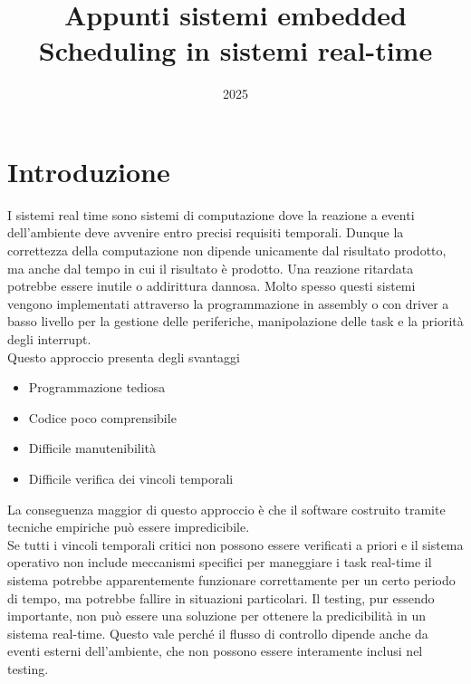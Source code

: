 \documentclass[12pt,openany,onesided]{book}
\title{Appunti sistemi embedded \\ Scheduling in sistemi real-time}
\author{}
\date{2025}
\begin{document}
\maketitle
\tableofcontents
\newpage
\chapter{Introduzione}

I sistemi real time sono sistemi di computazione dove la reazione a eventi dell'ambiente deve avvenire entro precisi requisiti temporali.
Dunque la correttezza della computazione non dipende unicamente dal risultato prodotto, ma anche dal tempo in cui il risultato è prodotto.
Una reazione ritardata potrebbe essere inutile o addirittura dannosa.
Molto spesso questi sistemi vengono implementati attraverso la programmazione in assembly o con driver a basso livello per la gestione delle periferiche, manipolazione delle task 
e la priorità degli interrupt.
\\
Questo approccio presenta degli svantaggi
\begin{itemize}
    \item Programmazione tediosa
    \item Codice poco comprensibile
    \item Difficile manutenibilità
    \item Difficile verifica dei vincoli temporali
\end{itemize}
La conseguenza maggior di questo approccio è che il software costruito tramite tecniche empiriche può  essere impredicibile.\\
Se tutti i vincoli temporali critici non possono essere verificati a priori e il sistema operativo non include meccanismi specifici per maneggiare i task real-time
il sistema potrebbe apparentemente funzionare correttamente per un certo periodo di tempo, ma potrebbe fallire in situazioni particolari.
Il testing, pur essendo importante, non può essere una soluzione per ottenere la predicibilità in un sistema real-time. Questo vale perché 
il flusso di controllo dipende anche da eventi esterni dell'ambiente, che non possono essere interamente inclusi nel testing.
\end{document}
